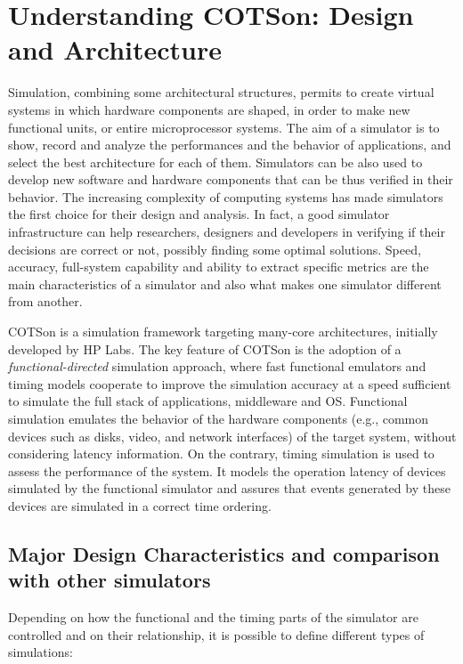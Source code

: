 \documentclass[a4paper]{article}
\begin{document}
\section[Understanding COTSon: Design and Architecture]{Understanding
COTSon: Design and Architecture}
{
Simulation, combining some architectural structures, permits to create
virtual systems in which hardware components are shaped, in order to
make new functional units, or entire microprocessor systems. The aim of
a simulator is to show, record and analyze the performances and the
behavior of applications, and select the best architecture for each of
them. Simulators can be also used to develop new software and hardware
components that can be thus verified in their behavior. The increasing
complexity of computing systems has made simulators the first choice
for their design and analysis. In fact, a good simulator infrastructure
can help researchers, designers and developers in verifying if their
decisions are correct or not, possibly finding some optimal solutions.
Speed, accuracy, full-system capability and ability to extract specific
metrics are the main characteristics of a simulator and also what makes
one simulator different from another.}

{
{COTSon is a simulation framework targeting many-core
architectures, initially developed by HP Labs. The key feature of
COTSon is the adoption of a
}\textit{{functional-directed
}}{simulation }{approach, where fast
functional emulators and timing models cooperate to improve the
simulation accuracy at a speed sufficient to simulate the full stack of
applications, middleware and OS. }{Functional
simulation}\textit{{ }}{emulates the
behavior of the hardware components (e.g., common devices such as
disks, video, and network interfaces) of the target system, without
considering latency information. On the contrary,
}{timing simulation}\textit{{
}}{is used to assess the performance of the system. It
models the operation latency of devices simulated by the functional
simulator and assures that events generated by these devices are
simulated in a correct time ordering.}}

\subsection[Major Design Characteristics and comparison with other
simulators]{Major Design Characteristics and comparison with other
simulators}
{
Depending on how the functional and the timing parts of the simulator
are controlled and on their relationship, it is possible to define
different types of simulations:}
\end{document}
